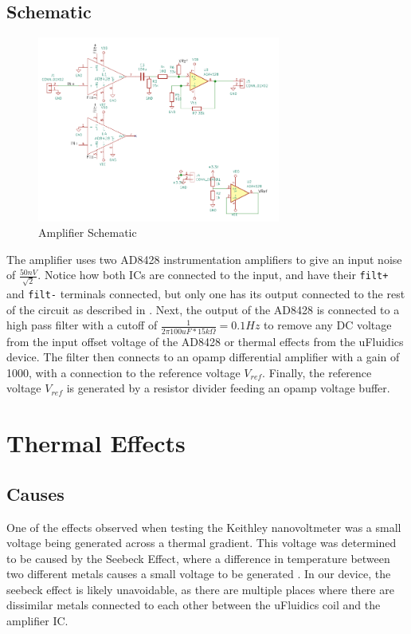 \documentclass[10pt, journal]{IEEEtran}
\begin{document}
\subsection{Schematic}

\begin{figure}[ht!]
  \includegraphics[width=8cm]{../photos/amp.png}
  \caption{Amplifier Schematic}
  \label{fig:amp}
\end{figure}

The amplifier uses two AD8428 instrumentation amplifiers to give an
input noise of $\frac{50nV}{\sqrt{2}}$\cite{ad8428-parallel}. Notice
how both ICs are connected to the input, and have their \texttt{filt+}
and \texttt{filt-} terminals connected, but only one has its output
connected to the rest of the circuit as described in
\cite{ad8428-parallel}. Next, the output of the AD8428 is connected to
a high pass filter with a cutoff of $\frac{1}{2\pi 100uF * 15k\Omega}
= 0.1Hz$ to remove any DC voltage from the input offset voltage of the
AD8428 or thermal effects from the uFluidics device. The filter then
connects to an opamp differential amplifier with a gain of 1000, with
a connection to the reference voltage $V_{ref}$. Finally, the
reference voltage $V_{ref}$ is generated by a resistor divider
feeding an opamp voltage buffer.

\section{Thermal Effects}
\subsection{Causes}
One of the effects observed when testing the Keithley nanovoltmeter
was a small voltage being generated across a thermal gradient. This
voltage was determined to be caused by the Seebeck Effect, where a
difference in temperature between two different metals causes a small
voltage to be generated \cite{seebeck}. In our device, the seebeck
effect is likely unavoidable, as there are multiple places where there
are dissimilar metals connected to each other between the uFluidics
coil and the amplifier IC.
\end{document}
